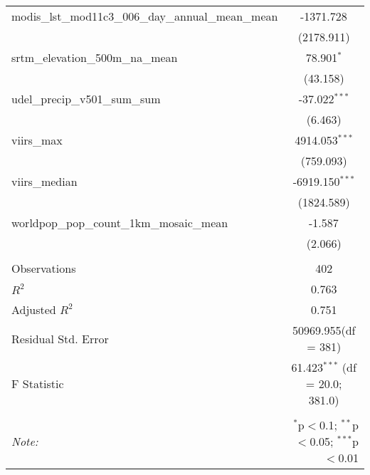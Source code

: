 \begin{table}[!htbp]
\begin{tabular}{@{\extracolsep{5pt}}lc}
 modis_lst_mod11c3_006_day_annual_mean_mean & -1371.728$^{}$ \\
  & (2178.911) \\
 srtm_elevation_500m_na_mean & 78.901$^{*}$ \\
  & (43.158) \\
 udel_precip_v501_sum_sum & -37.022$^{***}$ \\
  & (6.463) \\
 viirs_max & 4914.053$^{***}$ \\
  & (759.093) \\
 viirs_median & -6919.150$^{***}$ \\
  & (1824.589) \\
 worldpop_pop_count_1km_mosaic_mean & -1.587$^{}$ \\
  & (2.066) \\
\hline \\[-1.8ex]
 Observations & 402 \\
 $R^2$ & 0.763 \\
 Adjusted $R^2$ & 0.751 \\
 Residual Std. Error & 50969.955(df = 381)  \\
 F Statistic & 61.423$^{***}$ (df = 20.0; 381.0) \\
\hline
\hline \\[-1.8ex]
\textit{Note:} & \multicolumn{1}{r}{$^{*}$p$<$0.1; $^{**}$p$<$0.05; $^{***}$p$<$0.01} \\
\end{tabular}
\end{table}